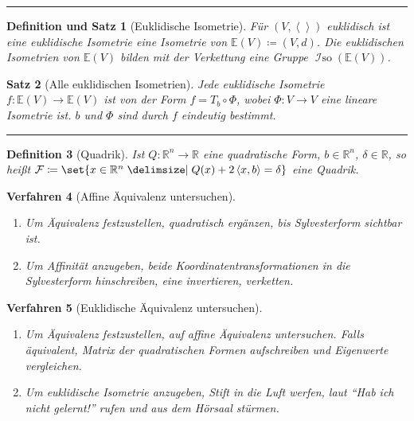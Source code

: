 \documentclass[a4paper]{article}
\newcounter{Sec}
\theoremstyle{marginbreak}
\newtheorem{definition}{Definition}[Sec]
\newtheorem{satz}[definition]{Satz}
\newtheorem{defsatz}[definition]{Definition und Satz}
\newtheorem{verfahren}[definition]{Verfahren}
\newcommand{\sep}{%
	\rule{\textwidth}{0.3pt}%
	\stepcounter{Sec}%
	}
\newcommand\scp[1]{\left\langle#1\right\rangle}
\begin{document}
	\sep
	\begin{defsatz}[Euklidische Isometrie]
		Für $(V,\scp{})$ euklidisch ist eine euklidische Isometrie eine Isometrie
		von $\mathbb{E}(V)\coloneqq (V, d)$. Die euklidischen Isometrien von $\mathbb{E}(V)$
		bilden mit der Verkettung eine Gruppe $\operatorname{\mathcal{I}so}(\mathbb{E}(V))$.
	\end{defsatz}
	\begin{satz}[Alle euklidischen Isometrien]
		Jede euklidische Isometrie $f\colon\mathbb{E}(V)\to\mathbb{E}(V)$ ist von der Form
		$f=T_b\circ\Phi$, wobei $\Phi\colon V\to V$ eine lineare Isometrie ist. $b$ und $\Phi$
		sind durch $f$ eindeutig bestimmt.
	\end{satz}
	\sep
	\begin{definition}[Quadrik]
		Ist $Q\colon\mathbb{R}^n\to\mathbb{R}$ eine quadratische Form, $b\in\mathbb{R}^n$,
		$\delta\in\mathbb{R}$, so heißt $\mathcal{F}\coloneqq\set{x\in\mathbb{R}^n\given Q(x)+2\scp{x, b}=\delta}$
		eine Quadrik.
	\end{definition}
	\begin{verfahren}[Affine Äquivalenz untersuchen]
		\begin{enumerate}
			\item Um Äquivalenz festzustellen, quadratisch ergänzen, bis Sylvesterform sichtbar ist.
			\item Um Affinität anzugeben, beide Koordinatentransformationen in die Sylvesterform hinschreiben,
				eine invertieren, verketten.
		\end{enumerate}
	\end{verfahren}
	\begin{verfahren}[Euklidische Äquivalenz untersuchen]
		\begin{enumerate}
			\item Um Äquivalenz festzustellen, auf affine Äquivalenz untersuchen. Falls äquivalent,
				Matrix der quadratischen Formen aufschreiben und Eigenwerte vergleichen.
			\item Um euklidische Isometrie anzugeben, Stift in die Luft werfen, laut
				\enquote{Hab ich nicht gelernt!} rufen und aus dem Hörsaal stürmen.
		\end{enumerate}
	\end{verfahren}
\end{document}
